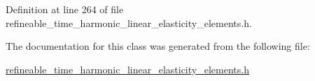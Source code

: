 Definition at line 264 of file refineable\+\_\+time\+\_\+harmonic\+\_\+linear\+\_\+elasticity\+\_\+elements.\+h.



The documentation for this class was generated from the following file\+:\begin{DoxyCompactItemize}
\item 
\hyperlink{refineable__time__harmonic__linear__elasticity__elements_8h}{refineable\+\_\+time\+\_\+harmonic\+\_\+linear\+\_\+elasticity\+\_\+elements.\+h}\end{DoxyCompactItemize}
